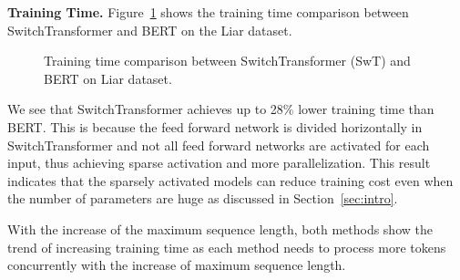 \noindent\textbf{Training Time.}
Figure~\ref{fig:trainingTime_comparison_liar} shows the training time comparison between SwitchTransformer and BERT on the Liar dataset.
\begin{figure}[h]
  \centering
 \hfill
  \caption{Training time comparison between SwitchTransformer (SwT) and BERT on Liar dataset.}
  \label{fig:trainingTime_comparison_liar}
\end{figure}

We see that SwitchTransformer achieves up to 28\% lower training time than BERT. This is because the feed forward network is divided horizontally in SwitchTransformer and not all feed forward networks are activated for each input, thus achieving sparse activation and more parallelization. This result indicates that the sparsely activated models can reduce training cost even when the number of parameters are huge as discussed in Section~\ref{sec:intro}.

With the increase of the maximum sequence length, both methods show the trend of increasing training time as each method needs to process more tokens concurrently with the increase of maximum sequence length.

